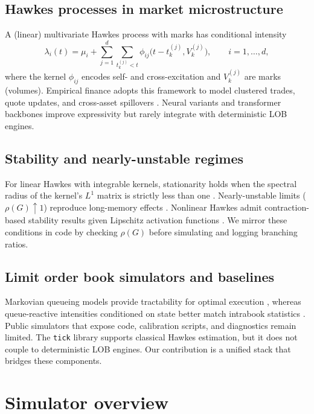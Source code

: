 \documentclass[11pt]{article}
\newcommand{\1}{\mathbbm{1}}
\begin{document}
\subsection{Hawkes processes in market microstructure}
A (linear) multivariate Hawkes process with marks has conditional intensity
\begin{equation}
\lambda_i(t) = \mu_i + \sum_{j=1}^d \sum_{t_k^{(j)}<t} \phi_{ij}\big(t-t_k^{(j)}, V_k^{(j)}\big), \qquad i=1,\dots,d,
\end{equation}
where the kernel $\phi_{ij}$ encodes self- and cross-excitation and $V_k^{(j)}$ are marks (volumes). Empirical finance adopts this framework to model clustered trades, quote updates, and cross-asset spillovers \cite{Bacry2015,ContKukanovStoikov2014}. Neural variants \cite{MeiEisner2017} and transformer backbones \cite{Zuo2020} improve expressivity but rarely integrate with deterministic LOB engines.

\subsection{Stability and nearly-unstable regimes}
For linear Hawkes with integrable kernels, stationarity holds when the spectral radius of the kernel's $L^1$ matrix is strictly less than one \cite{BremaudMassoulie1996}. Nearly-unstable limits ($\rho(G)\uparrow 1$) reproduce long-memory effects \cite{JaissonRosenbaum2015}. Nonlinear Hawkes admit contraction-based stability results given Lipschitz activation functions \cite{BremaudMassoulie1996}. We mirror these conditions in code by checking $\rho(G)$ before simulating and logging branching ratios.

\subsection{Limit order book simulators and baselines}
Markovian queueing models provide tractability for optimal execution \cite{ContLarrard2013}, whereas queue-reactive intensities conditioned on state better match intrabook statistics \cite{HuangLehalleRosenbaum2015}. Public simulators that expose code, calibration scripts, and diagnostics remain limited. The \texttt{tick} library \cite{Tick} supports classical Hawkes estimation, but it does not couple to deterministic LOB engines. Our contribution is a unified stack that bridges these components.

\section{Simulator overview}\label{sec:simulator}
\end{document}
